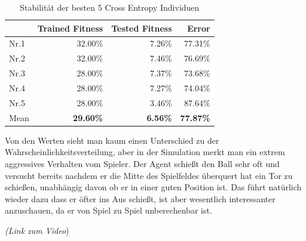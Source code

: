                 \begin{table}[H]
                    \begin{center}
                    \begin{tabular}{ |l|r|r|r| } 
                        \hline
                        \hfill & Trained Fitness   & Tested Fitness  &          Error    \\ \hline
                          Nr.1 &          32.00\%  &          7.26\% &          77.31\%  \\  
                          Nr.2 &          32.00\%  &          7.46\% &          76.69\%  \\  
                          Nr.3 &          28.00\%  &          7.37\% &          73.68\%  \\ 
                          Nr.4 &          28.00\%  &          7.27\% &          74.04\%  \\ 
                          Nr.5 &          28.00\%  &          3.46\% &          87.64\%  \\ \hline
                          Mean &  \textbf{29.60\%} & \textbf{6.56\%} & \textbf{77.87\%}  \\ \hline
                    \end{tabular}
                    \end{center}
                    \caption{Stabilität der besten 5 Cross Entropy Individuen \label{fig:crossentropytable}}
                \end{table}
                \noindent
                Von den Werten sieht man kaum einen Unterschied zu der Wahrscheinlichkeitsverteilung, aber in der Simulation merkt man ein extrem aggressives Verhalten vom Spieler. Der Agent schießt den Ball sehr oft und versucht bereits nachdem er die Mitte des Spielfeldes überquert hat ein Tor zu schießen, unabhängig davon ob er in einer guten Position ist. Das führt natürlich wieder dazu dass er öfter ins Aus schießt, ist aber wesentlich interessanter anzuschauen, da er von Spiel zu Spiel unberechenbar ist. \\

                \begin{center} \textit{(Link zum Video}) \end{center}
\newpage
